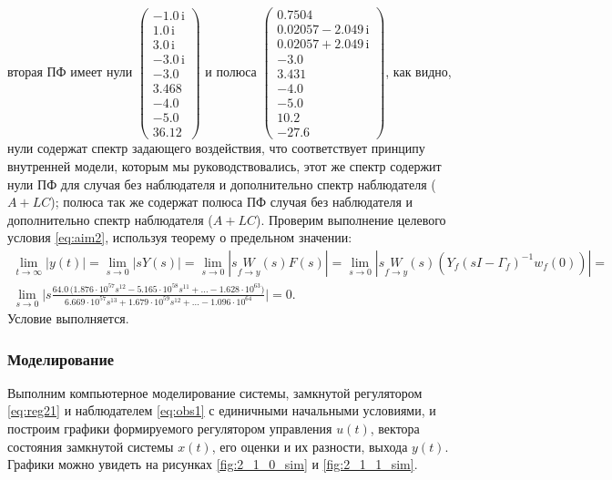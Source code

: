 вторая ПФ имеет нули $\left(\begin{array}{c}
-1.0\,\mathrm{i}\\
1.0\,\mathrm{i}\\
3.0\,\mathrm{i}\\
-3.0\,\mathrm{i}\\
-3.0\\
3.468\\
-4.0\\
-5.0\\
36.12
\end{array}\right)$ и полюса $\left(\begin{array}{c}
0.7504\\
0.02057-2.049\,\mathrm{i}\\
0.02057+2.049\,\mathrm{i}\\
-3.0\\
3.431\\
-4.0\\
-5.0\\
10.2\\
-27.6
\end{array}\right)$,
как видно, нули содержат спектр задающего воздействия, что 
соответствует принципу внутренней модели, которым мы руководствовались, этот же спектр 
содержит нули ПФ для случая без наблюдателя и 
дополнительно спектр наблюдателя ($A+LC$); полюса так же содержат полюса ПФ случая без
наблюдателя и дополнительно спектр наблюдателя ($A+LC$).
Проверим выполнение целевого условия \eqref{eq:aim2}, используя теорему о предельном
значении:
\begin{multline*}
    \lim_{t\rightarrow\infty}|y(t)|=\lim_{s\rightarrow0}|sY(s)|=
    \lim_{s\rightarrow0}|s\underset{f\rightarrow y}{W}(s)F(s)|=
    \lim_{s\rightarrow0}|s\underset{f\rightarrow y}{W}(s)(Y_f(sI-\Gamma_f)^{-1}w_{f}(0))|=\\
    \lim_{s\rightarrow0}\Bigg|s\frac{64.0\,\Big(1.876 \cdot 10^{57}s^{12} - 5.165 \cdot 10^{58}s^{11} + \dots - 1.628 \cdot 10^{63}\Big)}{
    6.669 \cdot 10^{57}s^{13} + 1.679 \cdot 10^{59}s^{12} + \dots - 1.096 \cdot 10^{64}}\Bigg|=0.
\end{multline*}
Условие выполняется.

\subsubsection{Моделирование}

Выполним компьютерное моделирование системы, замкнутой регулятором
\eqref{eq:reg21} и наблюдателем \eqref{eq:obs1} с единичными начальными условиями, 
и построим графики формируемого 
регулятором управления $u(t)$, вектора состояния замкнутой системы $x(t)$, его оценки и их разности, выхода
$y(t)$. Графики можно
увидеть на рисунках \ref{fig:2_1_0_sim} и \ref{fig:2_1_1_sim}.

